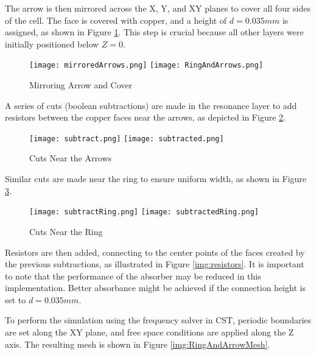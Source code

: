         The arrow is then mirrored across the X, Y, and XY planes to cover all
        four sides of the cell. The face is covered with copper, and a height of 
        $d=0.035 mm$ is assigned, as shown in Figure \ref{img:mirrorAndCover}. 
        This step is crucial because all other layers were initially positioned 
        below $Z=0$.
        \begin{figure}[h]
            \centering
            \texttt{[image: mirroredArrows.png]}\hfil
            \texttt{[image: RingAndArrows.png]}
            \caption{Mirroring Arrow and Cover}
            \label{img:mirrorAndCover}
        \end{figure}

        A series of cuts (boolean subtractions) are made in the resonance layer
        to add resistors between the copper faces near the arrows, as depicted 
        in Figure \ref{img:arrowCuts}.
        \begin{figure}[h]
            \centering
            \texttt{[image: subtract.png]}\hfil
            \texttt{[image: subtracted.png]}
            \caption{Cuts Near the Arrows}
            \label{img:arrowCuts}
        \end{figure}

        Similar cuts are made near the ring to ensure uniform width, as shown 
        in Figure \ref{img:ringCuts}.
        \begin{figure}[h]
            \centering
            \texttt{[image: subtractRing.png]}\hfil
            \texttt{[image: subtractedRing.png]}
            \caption{Cuts Near the Ring}
            \label{img:ringCuts}
        \end{figure}

        Resistors are then added, connecting to the center points of the faces
        created by the previous subtractions, as illustrated in Figure 
        \ref{img:resistors}. It is important to note that the performance of 
        the absorber may be reduced in this implementation. Better absorbance 
        might be achieved if the connection height is set to $d=0.035mm$.

        To perform the simulation using the frequency solver in CST, periodic 
        boundaries are set along the XY plane, and free space conditions are 
        applied along the Z axis. The resulting mesh is shown in Figure 
        \ref{img:RingAndArrowMesh}.
        
